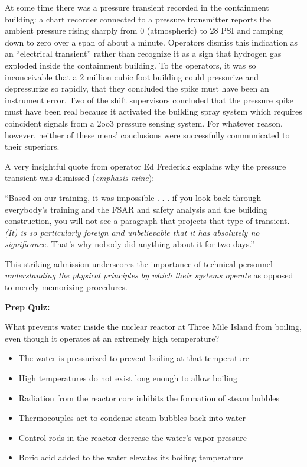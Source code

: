 At some time there was a pressure transient recorded in the containment building: a chart recorder connected to a pressure transmitter reports the ambient pressure rising sharply from 0 (atmospheric) to 28 PSI and ramping down to zero over a span of about a minute.  Operators dismiss this indication as an ``electrical transient'' rather than recognize it as a sign that hydrogen gas exploded inside the containment building.  To the operators, it was so inconceivable that a 2 million cubic foot building could pressurize and depressurize so rapidly, that they concluded the spike must have been an instrument error.  Two of the shift supervisors concluded that the pressure spike must have been real because it activated the building spray system which requires coincident signals from a 2oo3 pressure sensing system.  For whatever reason, however, neither of these mens' conclusions were successfully communicated to their superiors.

A very insightful quote from operator Ed Frederick explains why the pressure transient was dismissed ({\it emphasis mine}):

\vskip 10pt {\narrower \noindent \baselineskip5pt

``Based on our training, it was impossible . . . if you look back through everybody's training and the FSAR and safety analysis and the building construction, you will not see a paragraph that projects that type of transient.  {\it (It) is so particularly foreign and unbelievable that it has absolutely no significance.}  That's why nobody did anything about it for two days.''

\par} \vskip 10pt

This striking admission underscores the importance of technical personnel {\it understanding the physical principles by which their systems operate} as opposed to merely memorizing procedures.











\vfil \eject

\noindent
{\bf Prep Quiz:}

What prevents water inside the nuclear reactor at Three Mile Island from boiling, even though it operates at an extremely high temperature?

\begin{itemize}
\item{} The water is pressurized to prevent boiling at that temperature
\vskip 5pt 
\item{} High temperatures do not exist long enough to allow boiling
\vskip 5pt 
\item{} Radiation from the reactor core inhibits the formation of steam bubbles
\vskip 5pt 
\item{} Thermocouples act to condense steam bubbles back into water
\vskip 5pt 
\item{} Control rods in the reactor decrease the water's vapor pressure
\vskip 5pt 
\item{} Boric acid added to the water elevates its boiling temperature
\end{itemize}




